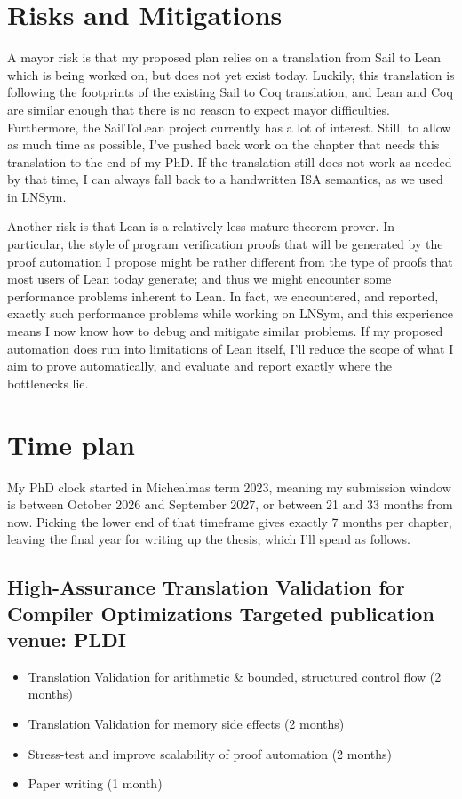 \documentclass[a4paper]{scrartcl}
\begin{document}
\section{Risks and Mitigations}

A mayor risk is that my proposed plan relies on a translation from Sail to Lean 
which is being worked on, but does not yet exist today. Luckily, this translation
is following the footprints of the existing Sail to Coq translation, 
and Lean and Coq are similar enough that there is no reason to expect mayor difficulties.
Furthermore, the SailToLean project currently has a lot of interest.
Still, to allow as much time as possible, I've pushed back work on the chapter that needs this
translation to the end of my PhD. If the translation still does not work as needed by that time,
I can always fall back to a handwritten ISA semantics, as we used in LNSym.

Another risk is that Lean is a relatively less mature theorem prover.
In particular, the style of program verification proofs that will be generated by the proof automation
I propose might be rather different from the type of proofs that most users of Lean
today generate; and thus we might encounter some performance problems inherent to Lean.
In fact, we encountered, and reported, exactly such performance problems while working on LNSym, and this experience means I now know how to debug and mitigate similar
problems.
If my proposed automation does run into limitations of Lean itself,
I'll reduce the scope of what I aim to prove automatically, and 
evaluate and report exactly where the bottlenecks lie.


\section{Time plan}\label{timeplan}

My PhD clock started in Michealmas term 2023, meaning my submission
window is between October 2026 and September 2027, or between 21 and 33
months from now. Picking the lower end of that timeframe gives exactly 7
months per chapter, leaving the final year for writing up the thesis, which I'll
spend as follows.

\subsection*{High-Assurance Translation Validation for Compiler Optimizations
Targeted publication venue: PLDI}

\begin{itemize}
\item
  Translation Validation for arithmetic \& bounded, structured control
  flow (2 months)
\item
  Translation Validation for memory side effects (2 months)
\item
  Stress-test and improve scalability of proof automation (2 months)
\item
  Paper writing (1 month)
\end{itemize}
\end{document}
